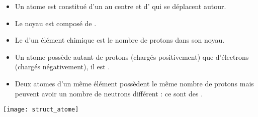 \begin{mybilan}
	\begin{itemize}
		\item Un atome est constitué d'un  au centre et d' qui se déplacent autour.
		\item Le noyau est composé de .
		\item Le  d'un élément chimique est le nombre de protons dans son noyau.
		\item Un atome possède autant de protons (chargés positivement) que d'électrons (chargés négativement), il est .
		\item Deux atomes d'un même élément possèdent le même nombre de protons mais peuvent avoir un nombre de neutrons différent : ce sont des .
	\end{itemize}
	
	\begin{center}
		\texttt{[image: struct\_atome]}
	\end{center}
	

\end{mybilan}
